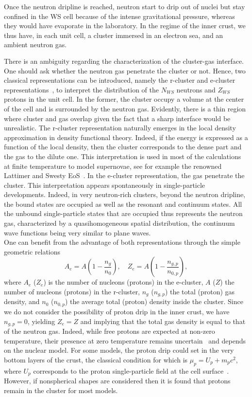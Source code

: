 Once the neutron dripline is reached, neutron start to drip out of nuclei but
stay confined in the WS cell because of the intense gravitational pressure,
whereas they would have evaporate in the laboratory. In the regime of the inner
crust, we thus have, in each unit cell, a cluster immersed in an electron sea, 
and an ambient neutron gas.

There is an ambiguity regarding the characterization of the cluster-gas
interface. One should ask whether the neutron gas penetrate the cluster or not.
Hence, two classical representations can be introduced, namely the r-cluster and
e-cluster representations~\cite{Papakonstantinou2013}, to interpret the
distribution
of the $N_{WS}$ neutrons and $Z_{WS}$ protons in the unit cell. In the former, the
cluster occupy a volume at the center of the cell and is surrounded
by the neutron gas. Evidently, there is a thin region where cluster and gas
overlap given the fact that a sharp interface would be unrealistic. The
r-cluster representation naturally emerges in the local density approximation
in density functional theory. Indeed, if the energy is expressed as a function
of the local density, then the cluster corresponds to the dense part and the
gas to the dilute one. This interpretation is used in most of the calculations
at finite temperature to model supernovae, see for example the renowned
Lattimer and Swesty EoS~\cite{Lattimer1991}. In the e-cluster representation,
the gas penetrate the cluster. This interpretation appears spontaneously in
single-particle developments. Indeed, in very neutron-rich clusters, beyond the
neutron dripline, the bound states are occupied as well as the resonant and
continuum states. All the unbound single-particle states that are occupied thus
represents the neutron gas, characterized by a quasihomogeneous spatial 
distribution, the continuum wave functions being very similar to plane waves.\\
One can benefit from the advantage of both representations through the simple
geometric relations
%
\begin{equation}
  A_e = A\left(1-\frac{n_g}{n_0}\right), \quad 
  Z_e = A\left(1-\frac{n_{g,p}}{n_{0,p}}\right),
\end{equation}
%
where $A_e$ ($Z_e$) is the number of nucleons (protons) in the e-cluster, $A$
($Z$) the number of nucleons (protons) in the r-cluster, $n_g$ ($n_{g,p}$) the 
total (proton) gas density, and $n_0$ ($n_{0,p}$) the average total (proton) 
density inside the cluster. Since we do not consider the possibility of proton 
drip in the inner crust, we have $n_{g,p} = 0$, yielding $Z_e = Z$ and implying
that the total gas density is equal to that of the neutron gas. Indeed, 
while free protons are expected at non-zero temperature, their presence at zero 
temperature remains uncertain~\cite{BBP} and depends on the nuclear model. For 
some models, the proton drip could set in the very bottom layers of the crust, 
the classical condition for which is $\mu_p = U_p + m_pc^2$, where $U_p$ 
corresponds to the proton single-particle field at the cell 
surface~\cite{Pearson2018}. However, if nonspherical shapes are considered 
then it is found that protons remain in the cluster for most models.

